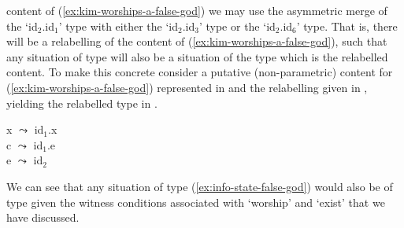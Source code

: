 content of
(\ref{ex:kim-worships-a-false-god}) we may use the asymmetric
merge of the `id$_2$.id$_1$' type with either the `id$_2$.id$_3$' type or the
`id$_2$.id$_6$' type.  That is, there will be a relabelling of the content of
(\ref{ex:kim-worships-a-false-god}), such that any situation of type
\preveg{} will also be a situation of the type which is the relabelled
content.  To make this concrete consider a putative (non-parametric) content
for (\ref{ex:kim-worships-a-false-god}) represented in  and
the relabelling given in , yielding the relabelled type in .
\begin{ex} 
\begin{subex} 
 
\item {} 
 
\item x $\leadsto$ id$_1$.x\\
      c $\leadsto$ id$_1$.e\\
      e $\leadsto$ id$_2$ 

\item {}
 
\end{subex} 
   
\end{ex} 
We can see that any situation of type (\ref{ex:info-state-false-god})
would also be of type  given the witness conditions
associated with `worship' and `exist' that we have discussed. 

